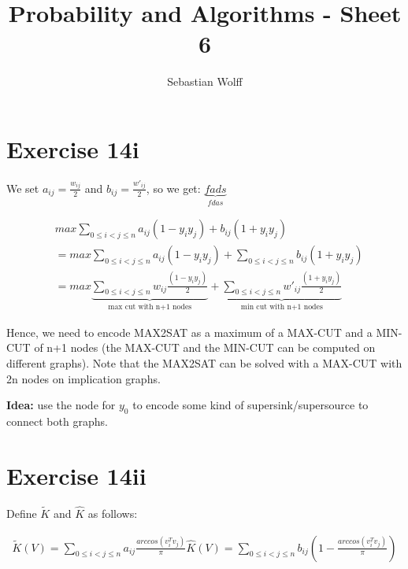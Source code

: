 \documentclass[11pt, oneside]{article}   	%
\title{Probability and Algorithms - Sheet 6}
\author{Sebastian Wolff}
\date{}							%
\begin{document}
\maketitle

\section*{Exercise 14i}

We set $a_{ij} = \frac{w_{ij}}{2}$ and $b_{ij} = \frac{w'_{ij}}{2}$, so we get:
$\underbrace{fads}_{fdas}$

\begin{eqnarray*}
&max \sum\limits_{0 \leq i < j \leq n} a_{ij}(1-y_iy_j) + b_{ij}(1+y_iy_j) \\
&= max \sum\limits_{0 \leq i < j \leq n} a_{ij}(1-y_iy_j) + \sum\limits_{0 \leq i < j \leq n} b_{ij}(1+y_iy_j) \\
&= max \underbrace{\sum\limits_{0 \leq i < j \leq n} w_{ij}\frac{(1-y_iy_j)}{2}}_{ \textrm{max cut with n+1 nodes} } + \underbrace{\sum\limits_{0 \leq i < j \leq n} w'_{ij}\frac{(1+y_iy_j)}{2}}_{\textrm{min cut with n+1 nodes}}
\end{eqnarray*}

Hence, we need to encode MAX2SAT as a maximum of a MAX-CUT and a MIN-CUT of n+1 nodes (the MAX-CUT and the MIN-CUT can be computed on different graphs).
Note that the MAX2SAT can be solved with a MAX-CUT with 2n nodes on implication graphs.

\textbf{Idea:} use the node for $y_0$ to encode some kind of supersink/supersource to connect both graphs.


\section*{Exercise 14ii}

Define $\tilde{K}$ and $\hat{K}$ as follows:

\begin{eqnarray*}
\tilde{K}(V) = \sum\limits_{0 \leq i < j \leq n} a_{ij}\frac{arccos(v_i^Tv_j)}{\pi}
\hat{K}(V) = \sum\limits_{0 \leq i < j \leq n} b_{ij}(1- \frac{arccos(v_i^Tv_j)}{\pi})
\end{eqnarray*}
\end{document}
